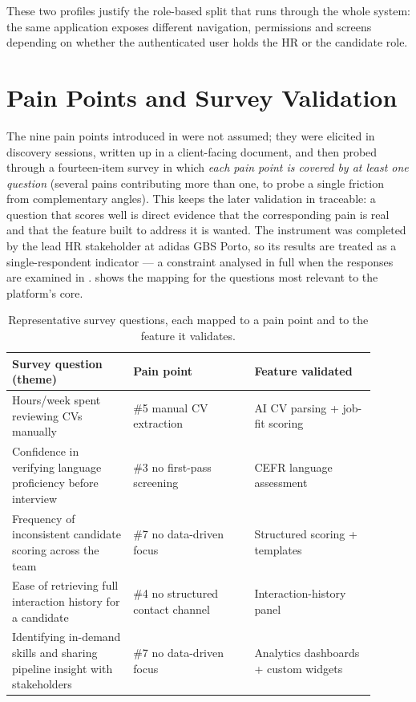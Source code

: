 These two profiles justify the role-based split that runs through the whole
system: the same application exposes different navigation, permissions and
screens depending on whether the authenticated user holds the HR or the
candidate role.


\section{Pain Points and Survey Validation}
\label{sec:analysis-pains}

The nine pain points introduced in  were
not assumed; they were elicited in discovery sessions, written up in a
client-facing document, and then probed through a fourteen-item survey in
which \emph{each pain point is covered by at least one question} (several
pains contributing more than one, to probe a single friction from
complementary angles). This keeps the later
validation in  traceable: a question that
scores well is direct evidence that the corresponding pain is real and that
the feature built to address it is wanted. The instrument was completed by the
lead HR stakeholder at adidas GBS Porto, so its results are treated as a
single-respondent indicator --- a constraint analysed in full when the
responses are examined in . 
shows the mapping for the questions most relevant to the platform's core.

\begin{table}[ht]
\centering
\caption[Survey questions mapped to pain points and features]{Representative
survey questions, each mapped to a pain point and to the feature it
validates.}
\label{tab:survey-mapping}
\small
\begin{tabular}{p{0.30\linewidth}p{0.30\linewidth}p{0.30\linewidth}}
\toprule
\textbf{Survey question (theme)} & \textbf{Pain point} & \textbf{Feature validated} \\
\midrule
Hours/week spent reviewing CVs manually & \#5 manual CV extraction & AI CV parsing + job-fit scoring \\
Confidence in verifying language proficiency before interview & \#3 no first-pass screening & CEFR language assessment \\
Frequency of inconsistent candidate scoring across the team & \#7 no data-driven focus & Structured scoring + templates \\
Ease of retrieving full interaction history for a candidate & \#4 no structured contact channel & Interaction-history panel \\
Identifying in-demand skills and sharing pipeline insight with stakeholders & \#7 no data-driven focus & Analytics dashboards + custom widgets \\
\bottomrule
\end{tabular}
\end{table}

